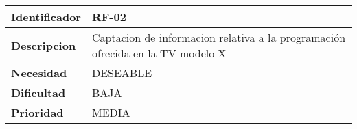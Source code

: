 \begin{center}
    \begin{tabular}{|p{2.6cm}|p{12cm}|}
    \hline
    \textbf{Identificador} & RF-02\\
    \hline
    \textbf{Descripcion} & Captacion de informacion relativa a la programación ofrecida en la TV modelo X\\
    \hline
    \textbf{Necesidad} & DESEABLE\\
    \hline
    \textbf{Dificultad} & BAJA\\
    \hline
    \textbf{Prioridad} & MEDIA\\
    \hline
    \end{tabular}
\end{center}
